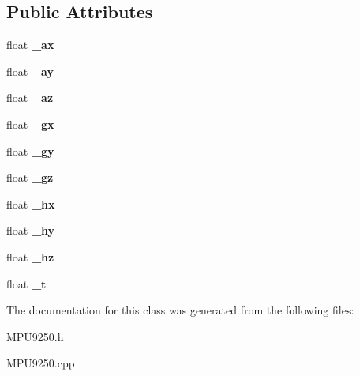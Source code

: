 \subsection*{Public Attributes}
\begin{DoxyCompactItemize}
\item 
\mbox{\label{class_m_p_u9250_a7f80ffcecb0dd28d2353b46f429d2a5f}} 
float {\bfseries \+\_\+ax}
\item 
\mbox{\label{class_m_p_u9250_a32369a95df72383edd03fff2c7439233}} 
float {\bfseries \+\_\+ay}
\item 
\mbox{\label{class_m_p_u9250_aac7e2beff39549eaa82c7d677b8cc42e}} 
float {\bfseries \+\_\+az}
\item 
\mbox{\label{class_m_p_u9250_a9af2d19af34ffdeb2d09f61f43ab62a8}} 
float {\bfseries \+\_\+gx}
\item 
\mbox{\label{class_m_p_u9250_a3e4d7f5b0f10fecaf6e4cad3235d6e29}} 
float {\bfseries \+\_\+gy}
\item 
\mbox{\label{class_m_p_u9250_af68ffa42e0bf808af73b11a9694d4f86}} 
float {\bfseries \+\_\+gz}
\item 
\mbox{\label{class_m_p_u9250_a0f8f1f024f8d3b0461385b53022472ac}} 
float {\bfseries \+\_\+hx}
\item 
\mbox{\label{class_m_p_u9250_a25695de739e4ca8432995c81592a5ed1}} 
float {\bfseries \+\_\+hy}
\item 
\mbox{\label{class_m_p_u9250_a28763d4c62447190bdb038623c2fc8c6}} 
float {\bfseries \+\_\+hz}
\item 
\mbox{\label{class_m_p_u9250_a614da2a23f959ed1c3e68bae5389983d}} 
float {\bfseries \+\_\+t}
\end{DoxyCompactItemize}


The documentation for this class was generated from the following files\+:\begin{DoxyCompactItemize}
\item 
M\+P\+U9250.\+h\item 
M\+P\+U9250.\+cpp\end{DoxyCompactItemize}
